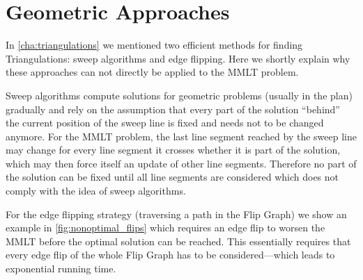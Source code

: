 \section{Geometric Approaches}
In \cref{cha:triangulations} we mentioned two efficient methods for
finding Triangulations: sweep algorithms and edge flipping. Here we
shortly explain why these approaches can not directly be applied to
the \gls{MMLT} problem.

Sweep algorithms compute solutions for geometric problems (usually in
the plan) gradually and rely on the assumption that every part of the
solution ``behind'' the current position of the sweep line is fixed
and needs not to be changed anymore. For the \gls{MMLT} problem, the
last line segment reached by the sweep line may change for every line
segment it crosses whether it is part of the solution, which may then
force itself an update of other line segments. Therefore no part of
the solution can be fixed until all line segments are considered which
does not comply with the idea of sweep algorithms.

For the edge flipping strategy (traversing a path in the Flip Graph)
we show an example in \cref{fig:nonoptimal_flips} which requires an
edge flip to worsen the \gls{MMLT} before the optimal solution can be
reached. This essentially requires that every edge flip of the whole
Flip Graph has to be considered---which leads to exponential running
time.

